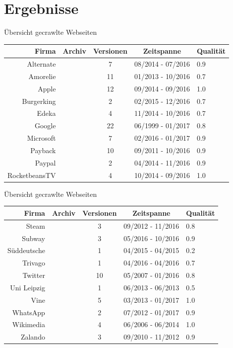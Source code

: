 \documentclass[halfparskip]{beamer}
\newcommand{\cmark}{\ding{51}}
\newcommand{\xmark}{\ding{55}}
\begin{document}
\section{Ergebnisse}
\begin{frame}{Übersicht gecrawlte Webseiten}
	\begin{block}{}
		\begin{tabularx}{\textwidth}{|r|c|c|c|X|}
			\hline
			\textbf{Firma} & \textbf{Archiv} & \textbf{Versionen} & \textbf{Zeitspanne} & \textbf{Qualität} \\ \hline \hline
			Alternate & \xmark & 7 & 08/2014 - 07/2016 &  0.9 \\ \hline
			Amorelie & \xmark & 11 & 01/2013 - 10/2016 &  0.7 \\ \hline
			Apple & \xmark & 12 & 09/2014 - 09/2016 &  1.0 \\ \hline
			Burgerking & \xmark & 2 & 02/2015 - 12/2016 &  0.7 \\ \hline
			Edeka & \xmark & 4 & 11/2014 - 10/2016 &  0.7 \\ \hline
			Google & \cmark & 22 & 06/1999 - 01/2017 &  0.8 \\ \hline
			Microsoft & \xmark & 7 & 02/2016 - 01/2017 &  0.9 \\ \hline
			Payback & \xmark & 10 & 09/2011 - 10/2016 &  0.9 \\ \hline
			Paypal & \xmark & 2 & 04/2014 - 11/2016 &  0.9 \\ \hline
			RocketbeansTV & \xmark & 4 & 10/2014 - 09/2016 &  1.0 \\ \hline
		\end{tabularx}
	\end{block}
\end{frame}
\begin{frame}{Übersicht gecrawlte Webseiten}
	\begin{block}{}
		\begin{tabularx}{\textwidth}{|r|c|c|c|X|}
			\hline
			\textbf{Firma} & \textbf{Archiv} & \textbf{Versionen} & \textbf{Zeitspanne} & \textbf{Qualität} \\ \hline \hline
			Steam & \xmark & 3 & 09/2012 - 11/2016 &  0.8 \\ \hline
			Subway & \xmark & 3 & 05/2016 - 10/2016 &  0.9 \\ \hline
			Süddeutsche & \xmark & 1 & 04/2015 - 04/2015 &  0.2 \\ \hline
			Trivago & \xmark & 1 & 04/2016 - 04/2016 &  0.7 \\ \hline
			Twitter & \cmark & 10 & 05/2007 - 01/2016 &  0.8 \\ \hline
			Uni Leipzig & \xmark & 1 & 06/2013 - 06/2013 &  0.5 \\ \hline
			Vine & \xmark & 5 & 03/2013 - 01/2017 &  1.0 \\ \hline
			WhatsApp & \cmark & 2 & 07/2012 - 01/2017 &  0.9 \\ \hline
			Wikimedia & \cmark & 4 & 06/2006 - 06/2014 &  1.0 \\ \hline
			Zalando & \xmark & 3 & 09/2010 - 11/2012 &  0.9 \\ \hline
		\end{tabularx}
	\end{block}
\end{frame}
\end{document}
